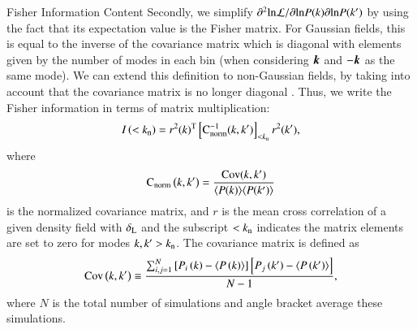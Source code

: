 \begin{section}{Fisher Information Content}
  Secondly, we simplify
  $\partial ^2 \mathrm{ln \mathcal{L}}/\partial \mathrm{ln} P(k) \partial
  \mathrm{ln} P(k')$
  by using the fact that its expectation value is the Fisher
  matrix.  For Gaussian fields, this is equal to the inverse of the
  covariance matrix which is diagonal with elements given by the
  number of modes in each bin (when considering $\boldsymbol{k}$ and $-\boldsymbol{k}$ as the same mode).  
  We can extend this definition to
  non-Gaussian fields, by taking into account that the covariance
  matrix is no longer diagonal \citep{bib:Rimes2006}.  Thus, we
  write the Fisher information in terms of matrix multiplication:
  \begin{align}
    I \left( < k_\mathrm{\textcolor{black}{n}}\right) = r^2(k)^{\mathrm{T}} \left[ \mathrm{\textcolor{black}{\boldsymbol{C}}^{-1}_{norm}} 
    ( k,k' )\right]_{<k_\mathrm{\textcolor{black}{n}}} r^2(k') ,
    \label{eq:fisherformulaused}
  \end{align}
  where
  \begin{align}
    \mathrm{\textcolor{black}{\boldsymbol{C}}_{norm}} \left( k,k' \right)=\frac{\mathrm{\textcolor{black}{\boldsymbol{Cov}}}(k,k')}
    {\langle P(k)\rangle\langle P(k')\rangle}
  \end{align}
  is the normalized covariance matrix, and
  $r$ is the mean cross correlation of a given density field with
  $\delta_\mathrm{\textcolor{black}{L}}$ and the subscript $<k_\mathrm{\textcolor{black}{n}}$ indicates the matrix elements are set to
  zero for modes $k,k'>k_\mathrm{\textcolor{black}{n}}$.  The covariance matrix is defined as
  \begin{align}
    \mathrm{\textcolor{black}{\boldsymbol{Cov}}}\left(k,k'\right)\equiv \frac{\sum_{i,j=1}^{N}\left[ P_i \left( k \right) - 
    \langle P \left( k \right) \rangle \right]\left[ P_j \left( k' \right) - 
    \langle P \left( k' \right)\rangle \right]}{N-1},
  \end{align}
  where $N$ is the total number of simulations and angle bracket average these simulations.  


\end{section}
